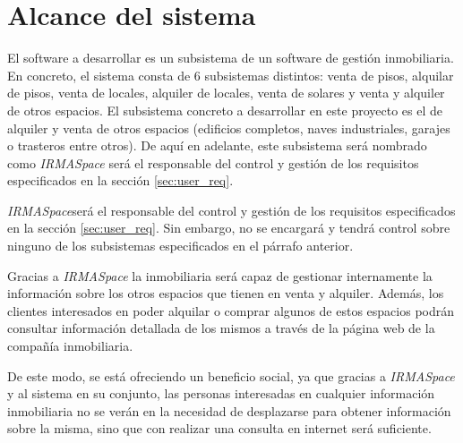 \section{Alcance del sistema}\label{sec:scope}
\par El software a desarrollar es un subsistema de un software de gestión inmobiliaria. En concreto, el sistema consta de 6 subsistemas distintos: venta de pisos, alquilar de pisos, venta de locales, alquiler de locales, venta de solares y venta y alquiler de otros espacios. El subsistema concreto a desarrollar en este proyecto es el de alquiler y venta de otros espacios (edificios completos, naves industriales, garajes o trasteros entre otros). De aquí en adelante, este subsistema será nombrado como \textit{IRMASpace} será el responsable del control y gestión de los requisitos especificados en la sección \ref{sec:user_req}.

\par \textit{IRMASpace}será el responsable del control y gestión de los requisitos especificados en la sección \ref{sec:user_req}. Sin embargo, no se encargará y tendrá control sobre ninguno de los subsistemas especificados en el párrafo anterior.

\par Gracias a \textit{IRMASpace} la inmobiliaria será capaz de gestionar internamente la información sobre los otros espacios que tienen en venta y alquiler. Además, los clientes interesados en poder alquilar o comprar algunos de estos espacios podrán consultar información detallada de los mismos a través de la página web de la compañía inmobiliaria.

\par De este modo, se está ofreciendo un beneficio social, ya que gracias a \textit{IRMASpace} y al sistema en su conjunto, las personas interesadas en cualquier información inmobiliaria no se verán en la necesidad de desplazarse para obtener información sobre la misma, sino que con realizar una consulta en internet será suficiente.
